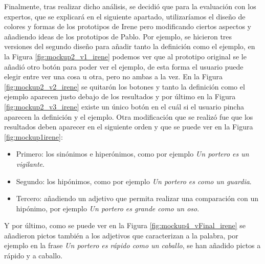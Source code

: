 Finalmente, tras realizar dicho análisis, se decidió que para la evaluación con los expertos, que se explicará en el siguiente apartado, utilizaríamos el diseño de colores y formas de los prototipos de Irene pero modificando ciertos aspectos y añadiendo ideas de los prototipos de Pablo. Por ejemplo, se hicieron tres versiones del segundo diseño para añadir tanto la definición como el ejemplo, en la Figura \ref{fig:mockup2_v1_irene} podemos ver que al prototipo original se le añadió otro botón para poder ver el ejemplo, de esta forma el usuario puede elegir entre ver una cosa u otra, pero no ambas a la vez. En la Figura \ref{fig:mockup2_v2_irene} se quitarón los botones y tanto la definición como el ejemplo aparecen justo debajo de los resultados y por último en la Figura \ref{fig:mockup2_v3_irene} existe un único botón en el cuál si el usuario pincha aparecen la definición y el ejemplo.
Otra modificación que se realizó fue que los resultados deben aparecer en el siguiente orden y que se puede ver en la Figura \ref{fig:mockup1irene}:

\begin{itemize} 
	\item Primero: los sinónimos e hiperónimos, como por ejemplo \textit{Un portero es un vigilante}.
	\item Segundo: los hipónimos, como por ejemplo \textit{Un portero es como un guardia}.
	\item Tercero: añadiendo un adjetivo que permita realizar una comparación con un hipónimo, por ejemplo \textit{Un portero es grande como un oso}.
\end{itemize}

Y por último, como se puede ver en la Figura \ref{fig:mockup4_vFinal_irene} se añadieron pictos también a los adjetivos que caracterizan a la palabra, por ejemplo en la frase \textit{Un portero es rápido como un caballo}, se han añadido pictos a rápido y a caballo.



 	
	
